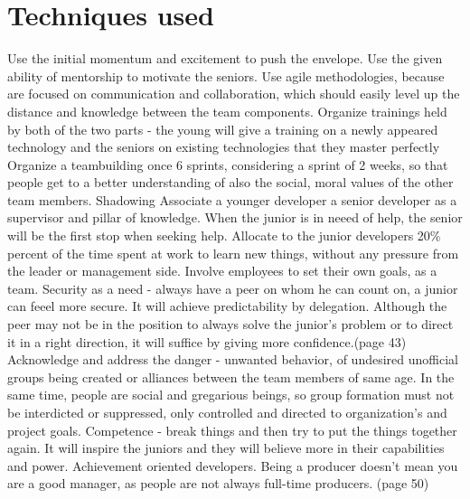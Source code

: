 \documentclass[conference]{IEEEtran}
\begin{document}
\section{Techniques used}
Use the initial momentum and excitement to push the envelope. Use the given ability of mentorship to motivate the seniors.
Use agile methodologies, because are focused on communication and collaboration, which should easily level up the distance and knowledge between the team components.
\newline\indent
Organize trainings held by both of the two parts - the young will give a training on a newly appeared technology and the seniors on existing technologies that they master perfectly
\newline\indent
Organize a teambuilding once 6 sprints, considering a sprint of 2 weeks, so that people get to a better understanding of also the social, moral values of the other team members.
\newline\indent
Shadowing
\newline\indent
Associate a younger developer a senior developer as a supervisor and pillar of knowledge. When the junior is in neeed of help, the senior will be the first stop when seeking help.
\newline\indent
Allocate to the junior developers 20\% percent of the time spent at work to learn new things, without any pressure from the leader or management side.
\newline\indent
Involve employees to set their own goals, as a team.
\newline\indent
Security as a need - always have a peer on whom he can count on, a junior can feeel more secure. It will achieve predictability by delegation. Although the peer may not be in the position to always solve the junior's problem or to direct it in a right direction, it will suffice by giving more confidence.(page 43)
\newline\indent
Acknowledge and address the danger - unwanted behavior, of undesired unofficial groups being created or alliances between the team members of same age. In the same time, people are social and gregarious beings, so group formation must not be interdicted or suppressed, only controlled and directed to organization's and project goals.
\newline\indent
Competence - break things and then try to put the things together again. It will inspire the juniors and they will believe more in their capabilities and power. Achievement oriented developers. Being a producer doesn't mean you are a good manager, as people are not always full-time producers. (page 50)
\end{document}
